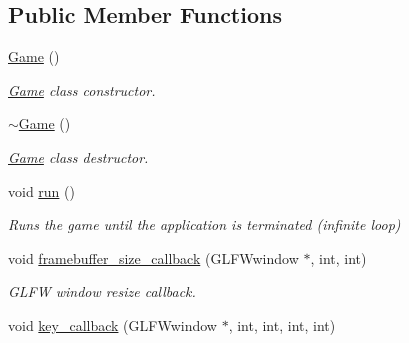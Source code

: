 \subsection*{Public Member Functions}
\begin{DoxyCompactItemize}
\item 
\hyperlink{class_game_ad59df6562a58a614fda24622d3715b65}{Game} ()\hypertarget{class_game_ad59df6562a58a614fda24622d3715b65}{}\label{class_game_ad59df6562a58a614fda24622d3715b65}

\begin{DoxyCompactList}\small\item\em \hyperlink{class_game}{Game} class constructor. \end{DoxyCompactList}\item 
\hyperlink{class_game_ae3d112ca6e0e55150d2fdbc704474530}{$\sim$\+Game} ()\hypertarget{class_game_ae3d112ca6e0e55150d2fdbc704474530}{}\label{class_game_ae3d112ca6e0e55150d2fdbc704474530}

\begin{DoxyCompactList}\small\item\em \hyperlink{class_game}{Game} class destructor. \end{DoxyCompactList}\item 
void \hyperlink{class_game_a1ab78f5ed0d5ea879157357cf2fb2afa}{run} ()\hypertarget{class_game_a1ab78f5ed0d5ea879157357cf2fb2afa}{}\label{class_game_a1ab78f5ed0d5ea879157357cf2fb2afa}

\begin{DoxyCompactList}\small\item\em Runs the game until the application is terminated (infinite loop) \end{DoxyCompactList}\item 
void \hyperlink{class_game_ace7bc47ba743c60418930ef28e670a7f}{framebuffer\+\_\+size\+\_\+callback} (G\+L\+F\+Wwindow $\ast$, int, int)\hypertarget{class_game_ace7bc47ba743c60418930ef28e670a7f}{}\label{class_game_ace7bc47ba743c60418930ef28e670a7f}

\begin{DoxyCompactList}\small\item\em G\+L\+FW window resize callback. \end{DoxyCompactList}\item 
void \hyperlink{class_game_a69df77af132026325999ae3700825e29}{key\+\_\+callback} (G\+L\+F\+Wwindow $\ast$, int, int, int, int)\hypertarget{class_game_a69df77af132026325999ae3700825e29}{}\label{class_game_a69df77af132026325999ae3700825e29}


\end{DoxyCompactItemize}
